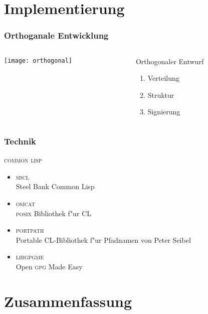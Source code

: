 \documentclass[german]{beamer}
\newcommand{\GPG}{\textsc{gpg}}
\newcommand{\SBCL}{\textsc{sbcl}}
\newcommand{\COMMONLISP}{\textsc{common lisp}}
\newcommand{\LIBGPGME}{\textsc{libgpgme}}
\newcommand{\OSICAT}{\textsc{osicat}}
\newcommand{\PORTPATH}{\textsc{portpath}}
\newcommand{\POSIX}{\textsc{posix}}
\begin{document}
\section{Implementierung}

\begin{frame}
  \frametitle{Orthoganale Entwicklung}
  \begin{columns}[c]
    \begin{column}{5cm}
      \texttt{[image: orthogonal]}
    \end{column}
    \begin{column}{7cm}
      \begin{block}{Orthogonaler Entwurf}
        \begin{enumerate}
        \item Verteilung 
        \item Struktur
        \item Signierung
        \end{enumerate}
      \end{block}

    \end{column}
  \end{columns}
\end{frame}

\begin{frame}
  \frametitle{Technik}
  \begin{block}{\COMMONLISP}
    \begin{itemize}
    \item \SBCL\\
      Steel Bank Common Lisp
    \item \OSICAT\\
      \POSIX{} Bibliothek f"ur CL
    \item \PORTPATH\\
      Portable CL-Bibliothek f"ur Pfadnamen von Peter Seibel
      \pause
    \item \LIBGPGME\\
      Open \GPG{} Made Easy
    \end{itemize}
  \end{block}
\end{frame}

\section{Zusammenfassung}
\end{document}
